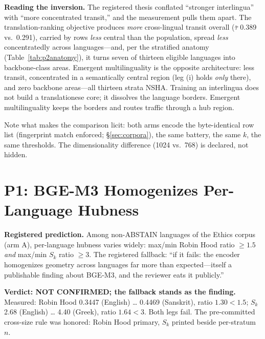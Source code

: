 \documentclass[11pt]{article}
\newcommand{\sk}{S_k}
\newcommand{\tmean}{\bar{\tau}}
\begin{document}
\textbf{Reading the inversion.} The registered thesis conflated
``stronger interlingua'' with ``more concentrated transit,'' and the
measurement pulls them apart. The translation-ranking objective produces
\emph{more} cross-lingual transit overall ($\tmean$ 0.389 vs.\ 0.291),
carried by rows \emph{less} central than the population, spread
\emph{less} concentratedly across languages---and, per the stratified
anatomy (Table~\ref{tab:p2anatomy}), it turns seven of thirteen eligible
languages into backbone-class areas. Emergent multilinguality is the
opposite architecture: less transit, concentrated in a semantically
central region (leg (i) holds \emph{only} there), and zero backbone
areas---all thirteen strata NSHA. Training an interlingua does not build a
translationese core; it dissolves the language borders. Emergent
multilinguality keeps the borders and routes traffic through a hub region.

Note what makes the comparison licit: both arms encode the byte-identical
row list (fingerprint match enforced; \S\ref{sec:corpora}), the same
battery, the same $k$, the same thresholds. The dimensionality difference
(1024 vs.\ 768) is declared, not hidden.

\section{P1: BGE-M3 Homogenizes Per-Language Hubness}
\label{sec:p1}

\textbf{Registered prediction.} Among non-ABSTAIN languages of the Ethics
corpus (arm A), per-language hubness varies widely: max/min Robin Hood
ratio $\ge 1.5$ \emph{and} max/min $\sk$ ratio $\ge 3$. The registered
fallback: ``if it fails: the encoder homogenizes geometry across languages
far more than expected---itself a publishable finding about BGE-M3, and
the reviewer eats it publicly.''

\textbf{Verdict: NOT CONFIRMED; the fallback stands as the finding.}
Measured: Robin Hood 0.3447 (English) \ldots{} 0.4469 (Sanskrit), ratio
$\mathbf{1.30} < 1.5$; $\sk$ 2.68 (English) \ldots{} 4.40 (Greek), ratio
$\mathbf{1.64} < 3$. Both legs fail. The pre-committed cross-size rule was
honored: Robin Hood primary, $\sk$ printed beside per-stratum $n$.
\end{document}
